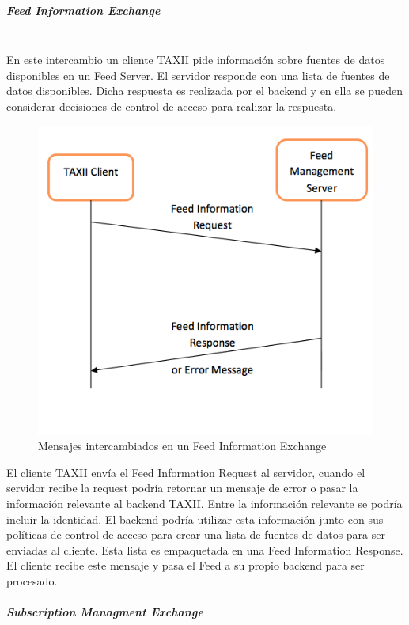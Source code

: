 \subparagraph{Feed Information Exchange}\ \\

En este intercambio un cliente TAXII pide información sobre fuentes de datos disponibles en 
un Feed Server. El servidor responde con una lista de fuentes de datos 
disponibles. Dicha respuesta es realizada por el backend y en ella se pueden considerar 
decisiones de control de acceso para realizar la respuesta.\\

\begin{figure}[H]
  \centering
    \includegraphics[width=140mm]{./images/FeedInformationExchange.png}
    \caption{Mensajes intercambiados en un Feed Information Exchange \protect\cite{b1}}
\end{figure}

El cliente TAXII envía el Feed Information Request al 
servidor, cuando el servidor recibe la request podría retornar un mensaje de 
error o pasar la información relevante al backend TAXII. Entre la información 
relevante se podría incluir la identidad. El backend podría utilizar esta 
información junto con sus políticas de control de acceso para crear una lista de 
fuentes de datos para ser enviadas al cliente. Esta lista es empaquetada en una 
Feed Information Response. El cliente recibe este mensaje y pasa el Feed a su 
propio backend para ser procesado.

\subparagraph{Subscription Managment Exchange}\ \\

